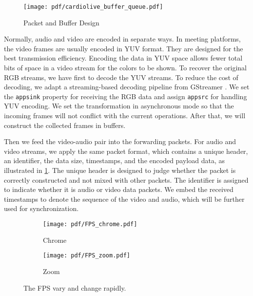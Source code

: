 \begin{figure}[t]
    \centering
    \texttt{[image: pdf/cardiolive\_buffer\_queue.pdf]}
    \caption{Packet and Buffer Design}
    \label{fig:packet_design}
\end{figure}
Normally, audio and video are encoded in separate ways. In meeting platforms, the video frames are usually encoded in YUV format. They are designed for the best transmission efficiency. Encoding the data in YUV space allows fewer total bits of space in a video stream for the colors to be shown. 
To recover the original RGB streams, we have first to decode the YUV streams. To reduce the cost of decoding, we adapt a streaming-based decoding pipeline from GStreamer \cite{GStreamer}. We set the \verb|appsink| property for receiving the RGB data and assign \verb|appsrc| for handling YUV encoding. We set the transformation in asynchronous mode so that the incoming frames will not conflict with the current operations. After that, we will construct the collected frames in buffers. 
 
Then we feed the video-audio pair into the forwarding packets. For audio and video streams, we apply the same packet format, which contains a unique header, an identifier, the data size, timestamps, and the encoded payload data, as illustrated in \fig\ref{fig:packet_design}. The unique header is designed to judge whether the packet is correctly constructed and not mixed with other packets.
The identifier is assigned to indicate whether it is audio or video data packets. We embed the received timestamps to denote the sequence of the video and audio, which will be further used for synchronization.


\begin{figure}[t]
    \centering
    \begin{minipage}{0.8\linewidth}
        \begin{subfigure}{.48\linewidth}
            \texttt{[image: pdf/FPS\_chrome.pdf]}
            \caption{Chrome}
            \label{subfig:FPS_chrome}
        \end{subfigure}\hfill
        \begin{subfigure}{.48\linewidth}
            \texttt{[image: pdf/FPS\_zoom.pdf]} %
            \caption{Zoom}
            \label{subfig:FPS_zoom}
        \end{subfigure}
    \end{minipage}
    \caption{The FPS vary and change rapidly.}
    \label{fig: FPS}
\end{figure}



